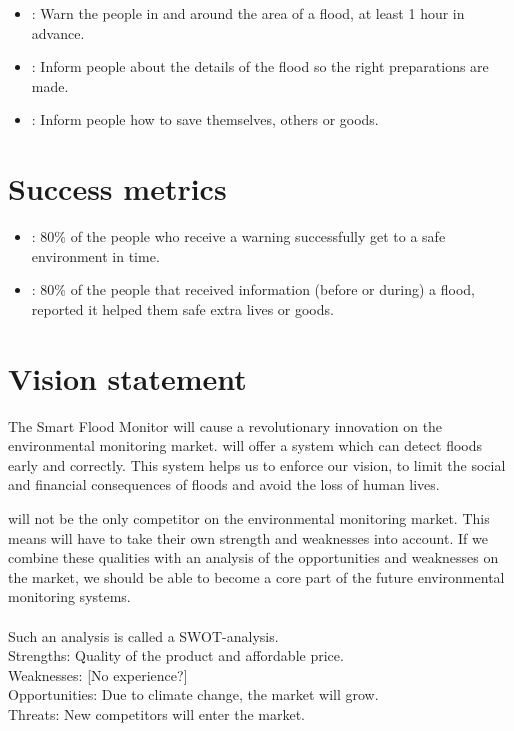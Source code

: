 \begin{itemize}
	\item {}: Warn the people in and around the area of a flood, at least 1 hour in advance.
	\item {}: Inform people about the details of the flood so the right preparations are made. 
	\item {}: Inform people how to save themselves, others or goods.
\end{itemize}

\section{Success metrics}
\begin{itemize}
	\item {}: 80\% of the people who receive a warning successfully get to a safe environment in time.
	\item {}: 80\% of the people that received information (before or during) a flood, reported it helped them safe extra lives or goods.
\end{itemize}

\section{Vision statement}
The Smart Flood Monitor will cause a revolutionary innovation on the environmental monitoring market. \CompanyName will offer a system which can detect floods early and correctly. This system helps us to enforce our vision, to limit the social and financial consequences of floods and avoid the loss of human lives. 

\CompanyName will not be the only competitor on the environmental monitoring market. This means \CompanyName will have to take their own strength and weaknesses into account. If we combine these qualities with an analysis of the opportunities and weaknesses on the market, we should be able to become a core part of the future environmental monitoring systems.\\\\

Such an analysis is called a SWOT-analysis. 
\\
Strengths: Quality of the product and affordable price.\\ %
Weaknesses: [No experience?]\\
Opportunities: Due to climate change, the market will grow. \\
Threats: New competitors will enter the market.\\\\


